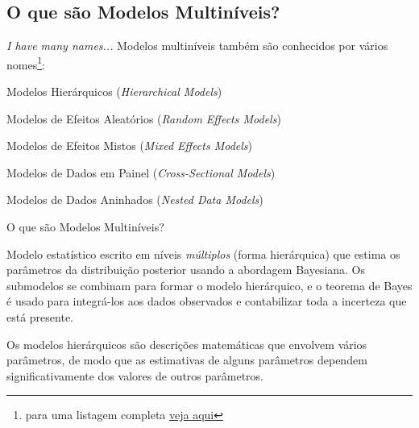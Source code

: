 \subsection{O que são Modelos Multiníveis?}
\begin{frame}{\textit{I have many names...}}
	Modelos multiníveis também são conhecidos por vários nomes\footnote{para uma listagem completa \href{https://statmodeling.stat.columbia.edu/2019/09/18/all-the-names-for-hierarchical-and-multilevel-modeling/}{veja aqui}}:
	\begin{vfilleditems}
		\item Modelos Hierárquicos (\textit{Hierarchical Models})
		\item Modelos de Efeitos Aleatórios (\textit{Random Effects Models})
		\item Modelos de Efeitos Mistos (\textit{Mixed Effects Models})
		\item Modelos de Dados em Painel (\textit{Cross-Sectional Models})
		\item Modelos de Dados Aninhados (\textit{Nested Data Models})
	\end{vfilleditems}
\end{frame}

\begin{frame}{O que são Modelos Multiníveis?}
	\begin{defn}
		Modelo estatístico escrito em níveis \textit{múltiplos} (forma hierárquica)
		que estima os parâmetros da distribuição posterior usando a abordagem
		Bayesiana. Os submodelos se combinam para formar o modelo hierárquico, e o
		teorema de Bayes é usado para integrá-los aos dados observados e contabilizar
		toda a incerteza que está presente.
	\end{defn}
	\vfill
	Os modelos hierárquicos são descrições matemáticas que envolvem vários parâmetros,
	de modo que as estimativas de alguns parâmetros dependem significativamente
	dos valores de outros parâmetros.
\end{frame}


